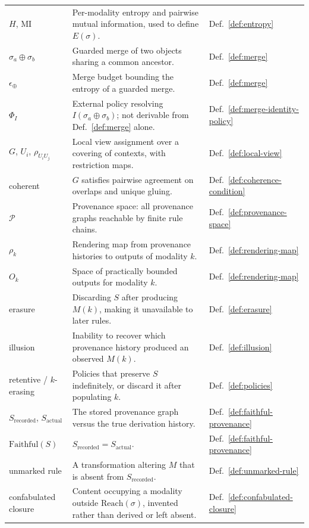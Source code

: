 \documentclass[11pt]{article}
\theoremstyle{definition}
\begin{document}
\begin{longtable}{@{}p{}p{}p{}@{}}
$H$, $\mathrm{MI}$ & Per-modality entropy and pairwise mutual information, used to define $E(\sigma)$. & Def.~\ref{def:entropy} \\
$\sigma_a \oplus \sigma_b$ & Guarded merge of two objects sharing a common ancestor. & Def.~\ref{def:merge} \\
$\epsilon_\oplus$ & Merge budget bounding the entropy of a guarded merge. & Def.~\ref{def:merge} \\
$\Phi_I$ & External policy resolving $I(\sigma_a \oplus \sigma_b)$; not derivable from Def.~\ref{def:merge} alone. & Def.~\ref{def:merge-identity-policy} \\
$G$, $U_i$, $\rho_{U_iU_j}$ & Local view assignment over a covering of contexts, with restriction maps. & Def.~\ref{def:local-view} \\
coherent & $G$ satisfies pairwise agreement on overlaps and unique gluing. & Def.~\ref{def:coherence-condition} \\
$\mathcal{P}$ & Provenance space: all provenance graphs reachable by finite rule chains. & Def.~\ref{def:provenance-space} \\
$\rho_k$ & Rendering map from provenance histories to outputs of modality $k$. & Def.~\ref{def:rendering-map} \\
$O_k$ & Space of practically bounded outputs for modality $k$. & Def.~\ref{def:rendering-map} \\
erasure & Discarding $S$ after producing $M(k)$, making it unavailable to later rules. & Def.~\ref{def:erasure} \\
illusion & Inability to recover which provenance history produced an observed $M(k)$. & Def.~\ref{def:illusion} \\
retentive / $k$-erasing & Policies that preserve $S$ indefinitely, or discard it after populating $k$. & Def.~\ref{def:policies} \\
$S_{\mathrm{recorded}}$, $S_{\mathrm{actual}}$ & The stored provenance graph versus the true derivation history. & Def.~\ref{def:faithful-provenance} \\
$\mathrm{Faithful}(S)$ & $S_{\mathrm{recorded}} = S_{\mathrm{actual}}$. & Def.~\ref{def:faithful-provenance} \\
unmarked rule & A transformation altering $M$ that is absent from $S_{\mathrm{recorded}}$. & Def.~\ref{def:unmarked-rule} \\
confabulated closure & Content occupying a modality outside $\mathrm{Reach}(\sigma)$, invented rather than derived or left absent. & Def.~\ref{def:confabulated-closure} \\

\end{longtable}
\end{document}
